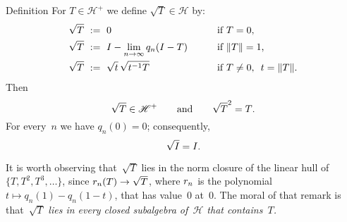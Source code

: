 \documentclass[main.tex]{subfiles}
\begin{document}
%
%
\begin{psec}{5.19}{Definition}
For $T\in{\mathscr H}^+$
we define $\sqrt{T}\in\mathscr H$ by:
\begin{alignat*}{2}
\sqrt{T}\ &:=\ 0 \qquad &&\htam{if }T=0\htam{,}\\
\sqrt{T}\ &:=\ I-\lim_{n\ra\infty} q_n(I-T) \qquad&&\htam{if }\|T\|=1\htam{,}\\
\sqrt{T}\ &:=\ \sqrt{t}\,\sqrt{t^{-1}T}\qquad 
&&\htam{if }T\neq 0\htam{, }\ t=\|T\|\htam{.}
\end{alignat*}
Then
\begin{equation*}
\sqrt{T} \in{\mathscr H}^+ \qquad \text{and} \qquad \sqrt{T}^2=T\text{.}
\end{equation*}
For every~$n$ we have $q_n(0)=0$;
consequently,
\begin{equation*}
\sqrt{I}=I\text{.}
\end{equation*}

It is worth observing that~$\sqrt{T}$ lies in the norm closure
of the linear hull of $\{T,T^2,T^3,\dotsc\}$,
since $r_n(T)\rightarrow \sqrt{T}$,
where $r_n$ is the polynomial 
$t\mapsto q_n(1)-q_n(1-t)$,
that has value~$0$ at~$0$.
The moral of that remark is that~$\sqrt{T}$
\emph{lies in every closed subalgebra of~$\mathscr H$
that contains~$T$.}
\end{psec}
\clearpage
\end{document}
